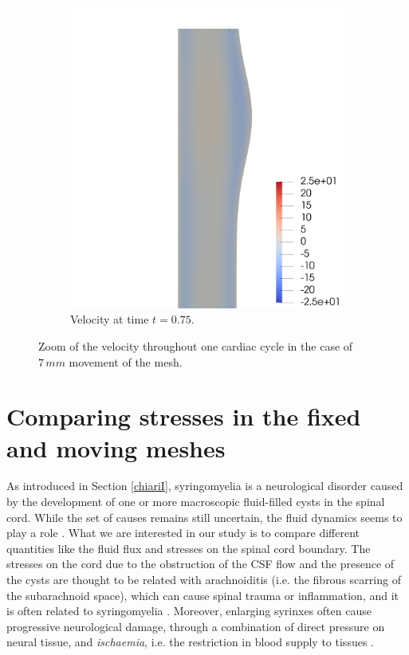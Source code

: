 \documentclass[a4paper,11pt,oneside]{book}
\begin{document}
\begin{figure}[h!]
\begin{subfigure}[b]{0.5\linewidth}
    \includegraphics[width=1.2\linewidth]{images/velocity_50_075.png} 
        \centering
    \caption{Velocity at time $t = 0.75$.} 
    \label{fig3:d} 
  \end{subfigure} 
  \centering
  \caption{Zoom of the velocity throughout one cardiac cycle in the case of $7 \, mm$ movement of the mesh.}
  \label{fig3} 
\end{figure}

\newpage

\section{Comparing stresses in the fixed and moving meshes}
As introduced in Section \ref{chiariI}, syringomyelia is a neurological disorder caused by the development of one or more macroscopic fluid-filled cysts in the spinal cord. While the set of causes remains still uncertain, the fluid dynamics seems to play a role \cite{elliott}. What we are interested in our study is to compare different quantities like the fluid flux and stresses on the spinal cord boundary. The stresses on the cord due to the obstruction of the CSF flow and the presence of the cysts are thought to be related with arachnoiditis (i.e. the fibrous scarring of the subarachnoid space), which can cause spinal trauma or inflammation, and it is often related to syringomyelia \cite{bertram}. Moreover, enlarging syrinxes often cause progressive neurological damage, through a combination of direct pressure on neural tissue, and \emph{ischaemia}, i.e. the restriction in blood supply to tissues \cite{elliott}.
\end{document}
